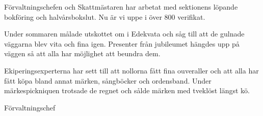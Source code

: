 \documentclass[../_main/handlingar.tex]{subfiles}
\begin{document}
Förvaltningschefen och Skattmästaren har arbetat med sektionens löpande bokföring och halvårsbokslut. Nu är vi uppe i över 800 verifikat.

Under sommaren målade utskottet om i Edekvata och såg till att de gulnade väggarna blev vita och fina igen. Presenter från jubileumet hängdes upp på väggen så att alla har möjlighet att beundra dem.

Ekiperingsexperterna har sett till att nollorna fått fina ouveraller och att alla har fått köpa bland annat märken, sångböcker och ordensband. Under märkespickniquen trotsade de regnet och sålde märken med tveklöst längst kö.

\begin{signatures}{1}
    \mvh
    \signature{Sophia Grimmeiss Grahm}{Förvaltningschef}
\end{signatures}
\end{document}
